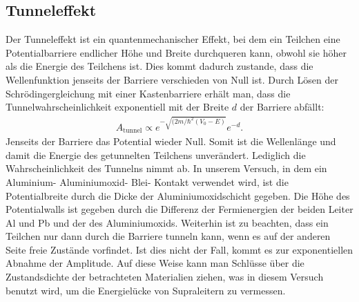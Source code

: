 \documentclass[twoside,        %
               BCOR12mm,       %
               english,ngerman, %
               fleqn,headsepline=false,footsepline=false
              ]{Vorlage/MFPREPORT}
\begin{document}
\subsection{Tunneleffekt}
Der Tunneleffekt ist ein quantenmechanischer Effekt, bei dem ein Teilchen eine
Potentialbarriere endlicher Höhe und Breite durchqueren kann, obwohl sie höher
als die Energie des Teilchens ist. Dies kommt dadurch zustande, dass die
Wellenfunktion jenseits der Barriere verschieden von Null ist. 
Durch Lösen der Schrödingergleichung mit einer Kastenbarriere erhält man,
dass die Tunnelwahrscheinlichkeit exponentiell mit der Breite $d$ der Barriere
abfällt: \cite{giaever1961study}
\begin{align}
    \label{eq:tunnelamp}
    A_\text{tunnel}\propto e^{-\sqrt{(2m/\hbar^2 (V_0-E)}}e^{-d}.
\end{align}
Jenseits der Barriere das Potential wieder Null. Somit ist die Wellenlänge und damit die Energie des getunnelten
Teilchens unverändert. Lediglich die Wahrscheinlichkeit des Tunnelns nimmt ab.
In unserem Versuch, in dem ein Aluminium- Aluminiumoxid- Blei- Kontakt
verwendet wird, ist die Potentialbreite durch die Dicke der
Aluminiumoxidschicht gegeben. Die Höhe des Potentialwalls ist gegeben durch die
Differenz der Fermienergien der beiden Leiter Al und Pb und der des
Aluminiumoxids.
Weiterhin ist zu beachten, dass ein Teilchen nur dann durch die Barriere
tunneln kann, wenn es auf der anderen Seite freie Zustände vorfindet. Ist dies
nicht der Fall, kommt es zur exponentiellen Abnahme der Amplitude. Auf diese
Weise kann man Schlüsse über die Zustandsdichte der betrachteten Materialien
ziehen, was in diesem Versuch benutzt wird, um die Energielücke von
Supraleitern zu vermessen.
\end{document}
